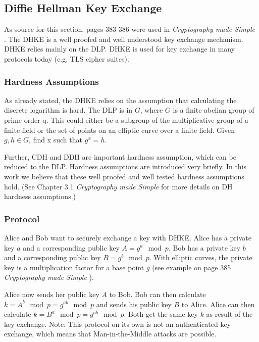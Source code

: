 \subsection{Diffie Hellman Key Exchange}
As source for this section, pages 383-386 were used in \textit{Cryptography made Simple} \cite{modernCrypto}.
\label{sec:preliminaries-DHKE}
The \acl{DHKE} is a well proofed and well understood key exchange mechanism.
\ac{DHKE} relies mainly on the \acl{DLP}.
\ac{DHKE} is used for key exchange in many protocols today (e.g. TLS cipher suites).

\subsubsection{Hardness Assumptions}
\label{sec:dlp}
As already stated, the \ac{DHKE} relies on the assumption that calculating the discrete logarithm is hard.
The \ac{DLP} is in $G$, where $G$ is a finite abelian group of prime order q.
This could either be a subgroup of the multiplicative group of a finite field or the set of points on an elliptic curve over a finite field.
Given $g,h \in G$, find x such that $g^x = h$.

Further, \ac{CDH} and \ac{DDH} are important hardness assumption, which can be reduced to the \ac{DLP}.
Hardness assumptions are introduced very briefly.
In this work we believe that these well proofed and well tested hardness assumptions hold.
(See Chapter 3.1 \textit{Cryptography made Simple} \cite{modernCrypto} for more details on DH hardness assumptions.)

\subsubsection{Protocol}
Alice and Bob want to securely exchange a key with \ac{DHKE}.
Alice has a private key $a$ and a corresponding public key $A = g^a \mod p$.
Bob has a private key $b$ and a corresponding public key  $B = g^b \mod p$.
With elliptic curves, the private key is a multiplication factor for a base point $g$ (see example on page 385 \textit{Cryptography made Simple} \cite{modernCrypto}).

Alice now sends her public key $A$ to Bob.
Bob can then calculate $k = A^b \mod p = g^{ab} \mod p$ and sends his public key $B$ to Alice.
Alice can then calculate $k = B^a \mod p = g^{ab} \mod p$.
Both get the same key $k$ as result of the key exchange.
Note: This protocol on its own is not an authenticated key exchange, which means that Man-in-the-Middle attacks are possible.

